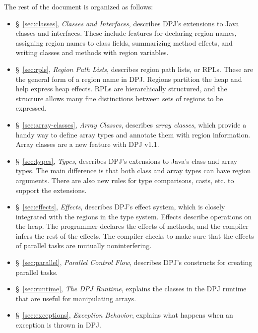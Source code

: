 The rest of the document is organized as follows:
%
\begin{itemize}
%
\item \S~\ref{sec:classes}, \emph{Classes and Interfaces}, describes
  DPJ's extensions to Java classes and interfaces.  These include
  features for declaring region names, assigning region names to class
  fields, summarizing method effects, and writing classes and methods
  with region variables.
%
\item \S~\ref{sec:rpls}, \emph{Region Path Lists}, describes region
  path lists, or RPLs.  These are the general form of a region name in
  DPJ.  Regions partition the heap and help express heap effects.
  RPLs are hierarchically structured, and the structure allows many
  fine distinctions between sets of regions to be expressed.
%
\item \S~\ref{sec:array-classes}, \emph{Array Classes}, describes
  \emph{array classes}, which provide a handy way to define array
  types and annotate them with region information.  Array classes are
  a new feature with DPJ v1.1.
%
\item \S~\ref{sec:types}, \emph{Types}, describes DPJ's extensions to
  Java's class and array types.  The main difference is that both
  class and array types can have region arguments.  There are also new
  rules for type comparisons, casts, etc. to support the extensions.
%
\item \S~\ref{sec:effects}, \emph{Effects}, describes DPJ's effect
  system, which is closely integrated with the regions in the type
  system.  Effects describe operations on the heap.  The programmer
  declares the effects of methods, and the compiler infers the rest of
  the effects.  The compiler checks to make sure that the effects of
  parallel tasks are mutually noninterfering.
%
\item \S~\ref{sec:parallel}, \emph{Parallel Control Flow}, describes
  DPJ's constructs for creating parallel tasks.
%
\item \S~\ref{sec:runtime}, \emph{The DPJ Runtime}, explains the classes in
  the DPJ runtime that are useful for manipulating arrays.
%
\item \S~\ref{sec:exceptions}, \emph{Exception Behavior}, explains
  what happens when an exception is thrown in DPJ.
%
\end{itemize}


